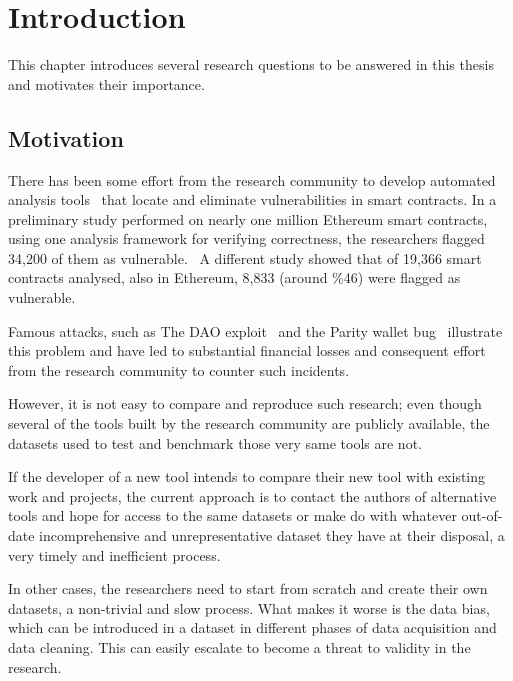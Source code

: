 \chapter{Introduction}

This chapter introduces several research questions to be answered in this thesis and motivates their importance.

\section{Motivation}
  There has been some effort from the research community to develop automated analysis tools~\cite{ref_tools} that locate and eliminate vulnerabilities in smart contracts.
  In a preliminary study performed on nearly one million Ethereum smart contracts, using one analysis framework for verifying correctness, the researchers flagged 34,200 of them as vulnerable.~\cite{ref_flag1}
  A different study showed that of 19,366 smart contracts analysed, also in Ethereum, 8,833 (around \%46) were flagged as vulnerable.~\cite{ref_flag2}
  
  Famous attacks, such as The DAO exploit~\cite{dao} and the Parity wallet bug~\cite{ref_parity} illustrate this problem and have led to substantial financial losses and consequent effort from the research community to counter such incidents.

  However, it is not easy to compare and reproduce such research; even though several of the tools built by the research community are publicly available, the datasets used to test and benchmark those very same tools are not.

  If the developer of a new tool intends to compare their new tool with existing work and projects, the current approach is to contact the authors of alternative tools and hope for access to the same datasets or make do with whatever out-of-date incomprehensive and unrepresentative dataset they have at their disposal, a very timely and inefficient process.

  In other cases, the researchers need to start from scratch and create their own datasets, a non-trivial and slow process.
  What makes it worse is the data bias, which can be introduced in a dataset in different phases of data acquisition and data cleaning.
  This can easily escalate to become a threat to validity in the research.~\cite{Empirical-Evaluation-of-Smart-Contract-Testing:What-is-the-Best-Choice}

